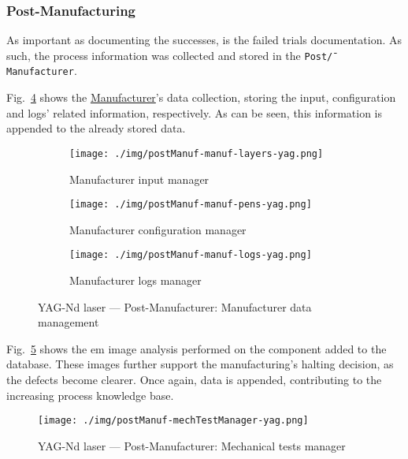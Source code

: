 \subsubsection{Post-Manufacturing}%
\label{sec:post-manufacturing-yag}
As important as documenting the successes, is the failed trials
documentation. As such, the process information was collected and stored in the
\texttt{Post\=/Manufacturer}.

Fig.~\ref{fig:postManuf-manuf-yag} shows the \underline{Manufacturer}'s data
collection, storing the input, configuration and logs' related information,
respectively. As can be seen, this information is appended to the already stored data.

\begin{figure}[htb!]
  \centering
  \begin{subfigure}[t]{.6\textwidth}
    \texttt{[image: ./img/postManuf-manuf-layers-yag.png]}%
  \caption{Manufacturer input manager}%
  \label{fig:postManuf-manuf-layers-yag}
  \end{subfigure}
%
  \begin{subfigure}[t]{.6\textwidth}
    \texttt{[image: ./img/postManuf-manuf-pens-yag.png]}%
  \caption{Manufacturer configuration manager}%
  \label{fig:postManuf-manuf-pens-yag}
\end{subfigure}
%
  \begin{subfigure}[t]{.6\textwidth}
    \texttt{[image: ./img/postManuf-manuf-logs-yag.png]}%
  \caption{Manufacturer logs manager}%
  \label{fig:postManuf-manuf-logs-yag}
\end{subfigure}
%
  \caption{YAG-Nd laser --- Post-Manufacturer: Manufacturer
    data management}%
  \label{fig:postManuf-manuf-yag}
\end{figure}

Fig.~\ref{fig:postManuf-mechTestManager-yag} shows the \gls{em} image
analysis performed on the component added to the database. These images further
support the manufacturing's halting decision, as the defects become
clearer. Once again, data is appended, contributing to the increasing process
knowledge base.

\begin{figure}[hbtp!]
  \centering
    \texttt{[image: ./img/postManuf-mechTestManager-yag.png]}
  \caption{YAG-Nd laser --- Post-Manufacturer: Mechanical tests manager}%
  \label{fig:postManuf-mechTestManager-yag}
\end{figure}

